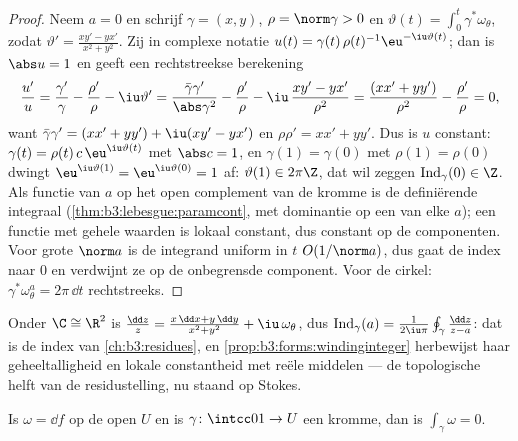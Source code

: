 \begin{proof}
Neem $a = 0$ en schrijf $\gamma = (x, y)$, $\rho = \norm\gamma >
0$ en $\vartheta(t) = \int_0^t\gamma^*\omega_\theta$, zodat
$\vartheta' = \frac{xy' - yx'}{x^2 + y^2}$. Zij in complexe
notatie $u(t) = \gamma(t)\,\rho(t)^{-1}\eu^{-\iu\vartheta(t)}$;
dan is $\abs u = 1$ en geeft een rechtstreekse berekening
\[
\frac{u'}{u} = \frac{\gamma'}{\gamma} - \frac{\rho'}{\rho}
- \iu\vartheta'
= \frac{\bar\gamma\gamma'}{\abs\gamma^2} -
\frac{\rho'}{\rho} - \iu\,\frac{xy' -
yx'}{\rho^2}
= \frac{(xx' + yy')}{\rho^2} - \frac{\rho'}{\rho} = 0,
\]
want $\bar\gamma\gamma' = (xx' + yy') + \iu(xy' - yx')$ en
$\rho\rho' = xx' + yy'$. Dus is $u$ constant: $\gamma(t) =
\rho(t)\,c\,\eu^{\iu\vartheta(t)}$ met $\abs c = 1$, en
$\gamma(1) = \gamma(0)$ met $\rho(1) = \rho(0)$ dwingt
$\eu^{\iu\vartheta(1)} = \eu^{\iu\vartheta(0)} = 1$ af:
$\vartheta(1) \in 2\pi\Z$, dat wil zeggen
$\operatorname{Ind}_\gamma(0) \in \Z$. Als functie van $a$ op het
open complement van de  kromme is de definiërende
integraal  (\cref{thm:b3:lebesgue:paramcont}, met
dominantie op een  van elke $a$); een  functie
met gehele waarden is lokaal constant, dus constant op de
componenten. Voor grote $\norm a$ is de integrand uniform in $t$
$O(1/\norm a)$, dus gaat de index naar $0$ en verdwijnt ze op de
onbegrensde component. Voor de cirkel:
$\gamma^*\omega_\theta^a = 2\pi\,\dd t$ rechtstreeks.
\end{proof}

\begin{remark}
Onder $\C \cong \R^2$ is $\frac{\dd z}{z} = \frac{x\,\dd x +
y\,\dd y}{x^2 + y^2} + \iu\,\omega_\theta$, dus
$\operatorname{Ind}_\gamma(a) =
\frac1{2\iu\pi}\oint_\gamma\frac{\dd z}{z - a}$: dat is de index
van \cref{ch:b3:residues}, en
\cref{prop:b3:forms:windinginteger} herbewijst haar
geheeltalligheid en lokale constantheid met reële middelen ---
de topologische helft van de residustelling, nu staand op
Stokes.
\end{remark}

\begin{proposition}\label{prop:b3:forms:exactloop}
Is $\omega = \dd f$  op de open $U$ en is
$\gamma\colon\intcc01\to U$ een  kromme, dan is
$\int_\gamma\omega = 0$.
\end{proposition}

